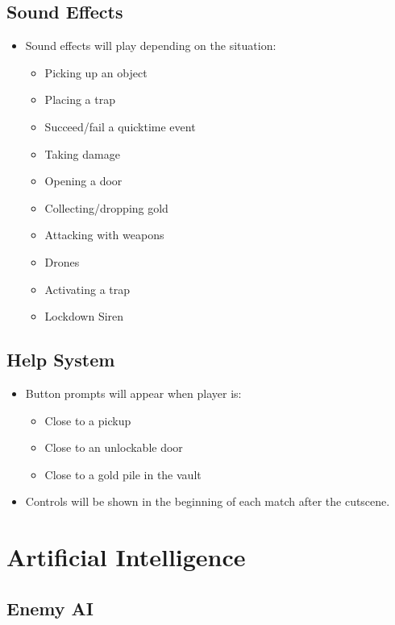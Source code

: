 \documentclass[10pt]{report}
\begin{document}
\section{Sound Effects}

\begin{itemize}
    \item Sound effects will play depending on the situation:
    \begin{itemize}
        \item Picking up an object
        \item Placing a trap
        \item Succeed/fail a quicktime event
        \item Taking damage
        \item Opening a door
        \item Collecting/dropping gold
        \item Attacking with weapons
        \item Drones
        \item Activating a trap
        \item Lockdown Siren
    \end{itemize}
\end{itemize}

\section{Help System}

\begin{itemize}
    \item Button prompts will appear when player is:
    \begin{itemize}
        \item Close to a pickup
        \item Close to an unlockable door
        \item Close to a gold pile in the vault
    \end{itemize}
    \item Controls will be shown in the beginning of each match after the cutscene.
\end{itemize}

\chapter{Artificial Intelligence}

\section{Enemy AI}
\end{document}
